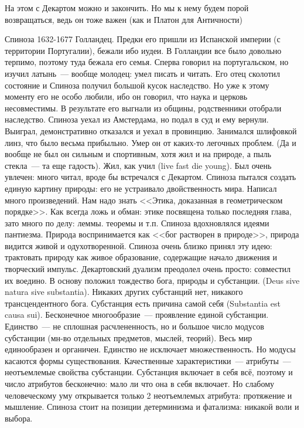 На этом с Декартом можно и закончить. Но мы к нему будем порой возвращаться, ведь он тоже важен (как и Платон для Античности)

Спиноза 1632-1677 Голландец.
Предки его пришли из Испанской империи (с территории Португалии), бежали ибо иудеи. В Голландии все было довольно терпимо, поэтому туда бежала его семья. Сперва говорил на португальском, но изучил латынь~--- вообще молодец: умел писать и читать. Его отец сколотил состояние и Спиноза получил большой кусок наследство. Но уже к этому моменту его не особо любили, ибо он говорил, что наука и церковь несовместимы. В результате его выгнали из общины, родственники отобрали наследство. Спиноза уехал из Амстердама, но подал в суд и ему вернули. Выиграл, демонстративно отказался и уехал в провинцию. Занимался шлифовкой линз, что было весьма прибыльно. Умер он от каких-то легочных проблем. (Да и вообще не был он сильным и спортивным, хотя жил и на природе, а пыль стекла~--- та еще гадость). Жил, как учил (live fast die young). Был очень увлечен: много читал, вроде бы встречался с Декартом. Спиноза пытался создать единую картину природы: его не устраивало двойственность мира. Написал много произведений. Нам надо знать <<Этика, доказанная в геометрическом порядке>>. Как всегда ложь и обман: этике посвящена только последняя глава, зато много по делу: леммы. теоремы и т.п. Спиноза вдохновлялся идеями пантиезма. Природа воспринимается как <<бог растворен в природе>>, природа видится живой и одухотворенной. Спиноза очень близко принял эту идею: трактовать природу как живое образование, содержащие начало движения и творческий импульс. Декартовский дуализм преодолел очень просто: совместил их воедино. В основу положил тождество бога, природы и субстанции. (Deus sive natura sive substantia). Никаких других субстанций нет, никакого трансцендентного бога. Субстанция есть причина самой себя (Substantia est causa sui). Бесконечное многообразие~--- проявление единой субстанции. Единство~--- не сплошная расчлененность, но и большое число модусов субстанции (мн-во отдельных предметов, мыслей, теорий). Весь мир единообразен и органичен. Единство не исключает множественность. Но модусы касаются формы существования.
Качественные характеристики~--- атрибуты~--- неотъемлемые свойства субстанции. Субстанция включает в себя всё, поэтому и число атрибутов бесконечно: мало ли что она в себя включает. Но слабому человеческому уму открывается только 2 неотъемлемых атрибута: протяжение и мышление.
Спиноза стоит на позиции детерминизма и фатализма: никакой воли и выбора.

